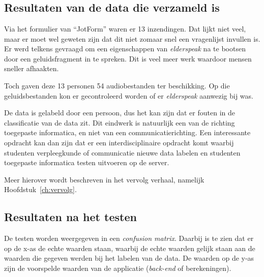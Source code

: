 
\chapter{}
\label{ch:resultaten}

\section{Resultaten van de data die verzameld is}
Via het formulier van ``JotForm'' waren er 13 inzendingen. Dat lijkt niet veel, maar er moet wel geweten zijn dat dit niet zomaar snel een vragenlijst invullen is. Er werd telkens gevraagd om een eigenschappen van \textit{elderspeak} na te bootsen door een geluidsfragment in te spreken. Dit is veel meer werk waardoor mensen sneller afhaakten.

Toch gaven deze 13 personen 54 audiobestanden ter beschikking. Op die geluidsbestanden kon er gecontroleerd worden of er \textit{elderspeak} aanwezig bij was.

De data is gelabeld door een persoon, dus het kan zijn dat er fouten in de classificatie van de data zit. Dit eindwerk is natuurlijk een van de richting toegepaste informatica, en niet van een communicatierichting. Een interessante opdracht kan dan zijn dat er een interdisciplinaire opdracht komt waarbij studenten verpleegkunde of communicatie nieuwe data labelen en studenten toegepaste informatica testen uitvoeren op de server.

Meer hierover wordt beschreven in het vervolg verhaal, namelijk Hoofdstuk~\ref{ch:vervolg}.

\section{Resultaten na het testen}
De testen worden weergegeven in een \textit{confusion matrix}. Daarbij is te zien dat er op de x-as de echte waarden staan, waarbij de echte waarden gelijk staan aan de waarden die gegeven werden bij het labelen van de data. De waarden op de y-as zijn de voorspelde waarden van de applicatie (\textit{back-end} of berekeningen).

